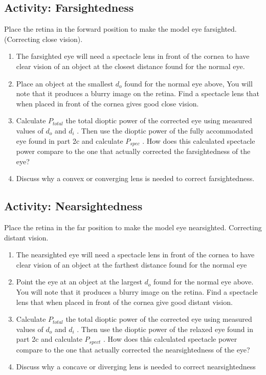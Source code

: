 \begin{multicols}{2}
\subsection{Activity: Farsightedness}
Place the retina in the forward position to make the model eye farsighted.(Correcting close vision).
\begin{enumerate}
	 \item The farsighted eye will need a spectacle lens in front of the cornea to have clear vision of an object at the closest distance found for the normal eye.
	\item Place an object at the smallest $d_o$ found for the normal eye above, You will note that it produces a blurry image on the retina. Find a spectacle lens that when placed in front of the cornea gives good close vision.
	\item Calculate $P_{total}$ the total dioptic power of the corrected eye using measured values of $d_o$ and $d_i$ . Then use the dioptic power of the fully accommodated eye found in part 2c and calculate $P_{spec}$ . How does this calculated spectacle power compare to the one that actually corrected the farsightedness of the eye?
	\item Discuss why a convex or converging lens is needed to correct farsightedness.
\end{enumerate}

\subsection{Activity: Nearsightedness}
Place the retina in the far position to make the model eye nearsighted. Correcting distant vision.
\begin{enumerate}
	\item The nearsighted eye will need a spectacle lens in front of the cornea to have clear vision of an object at the farthest distance found for the normal eye
	\item Point the eye at an object at the largest $d_o$ found for the normal eye above. You will note that it produces a blurry image on the retina. Find a spectacle lens that when placed in front of the cornea give good distant vision.
	\item Calculate $P_{total}$ the total dioptic power of the corrected eye using measured values of $d_o$ and $d_i$ . Then use the dioptic power of the relaxed eye found in part 2c and calculate $P_{spect}$ . How does this calculated spectacle power compare to the one that actually corrected the nearsightedness of the eye?
	\item Discuss why a concave or diverging lens is needed to correct nearsightedness
\end{enumerate}


\end{multicols}

